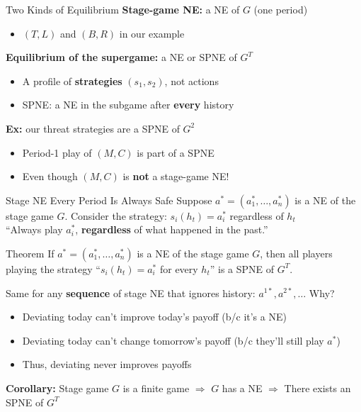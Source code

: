 \begin{frame}{Two Kinds of Equilibrium}
\textbf{Stage-game NE:} a NE of $G$ (one period)
\begin{itemize}
    \item $(T,L)$ and $(B,R)$ in our example
\end{itemize}
\bsk
\textbf{Equilibrium of the supergame:} a NE or SPNE of $G^T$
\begin{itemize}
    \item A profile of \textbf{strategies} $(s_1,s_2)$, not actions
    \item SPNE: a NE in the subgame after \textbf{every} history
\end{itemize}
\bsk
\textbf{Ex:} our threat strategies are a SPNE of $G^2$
\begin{itemize}
    \item Period-1 play of $(M,C)$ is part of a SPNE
    \item Even though $(M,C)$ is \textbf{not} a stage-game NE!
\end{itemize}
\vfill
\vspace{-0.3in}
\end{frame}

\begin{frame}{Stage NE Every Period Is Always Safe}
Suppose $a^*=(a_1^*,\ldots,a_n^*)$ is a NE of the stage game $G$.
\bsk
Consider the strategy: $s_i(h_t)=a_i^*$ regardless of $h_t$\\
``Always play $a_i^*$, \textbf{regardless} of what happened in the past.''
\bsk
\begin{block}{Theorem}
If $a^*=(a_1^*,\ldots,a_n^*)$ is a NE of the stage game $G$, then all players playing the strategy ``$s_i(h_t)=a_i^*$ for every $h_t$'' is a SPNE of $G^T$.
\end{block}
{\footnotesize Same for any \textbf{sequence} of stage NE that ignores history: $a^{1*}, a^{2*}, \dots$}
\bsk
Why?
\begin{itemize}
    \item Deviating today can't improve today's payoff (b/c it's a NE)
    \item Deviating today can't change tomorrow's payoff (b/c they'll still play $a^*$)
    \item Thus, deviating never improves payoffs
\end{itemize}
\bsk
\textbf{Corollary:} Stage game $G$ is a finite game $\Rightarrow$ $G$ has a NE $\Rightarrow$ There exists an SPNE of $G^T$
\vfill
\vspace{-0.3in}
\end{frame}

